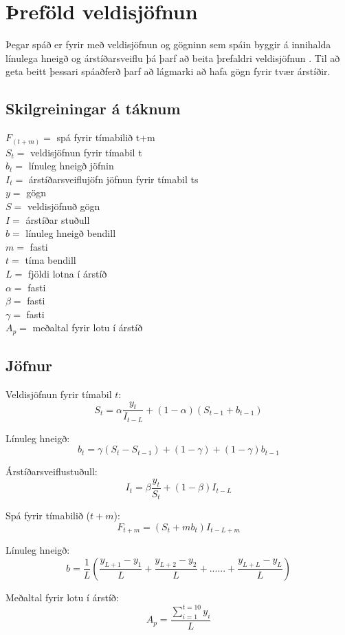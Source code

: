 \section {Þreföld veldisjöfnun}


Þegar spáð er fyrir með veldisjöfnun og gögninn sem spáin byggir á innihalda línulega hneigð og árstíðarsveiflu þá þarf að beita þrefaldri veldisjöfnun \cite{HoltWinters}. Til að geta beitt þessari spáaðferð þarf að lágmarki að hafa gögn fyrir tvær árstíðir.

\subsection{Skilgreiningar á táknum}
	$F_(t+m)=$ spá fyrir tímabilið  t+m \\
	$S_t =$  veldisjöfnun fyrir tímabil t\\
	$b_t =$ línuleg hneigð jöfnin \\
	$I_t =$ árstíðarsveiflujöfn jöfnun fyrir tímabil ts \\
	$y =$ gögn\\
	$S =$ veldisjöfnuð gögn \\
	$I =$	árstíðar stuðull \\
	$b =$ línuleg hneigð bendill \\
	$m =$ fasti	\\
	$t =$ tíma bendill \\
	$L =$ fjöldi lotna í árstíð \\
	$\alpha =$ fasti \\
	$\beta =$ fasti \\
	$\gamma =$ fasti \\
	$A_p =$ meðaltal fyrir lotu í árstíð\\


\subsection{Jöfnur}

\noindent Veldisjöfnun fyrir tímabil $t$:
	$$S_t = \alpha\dfrac{y_t}{I_{t - L}} + (1-\alpha)(S_{t-1}+ b_{t-1} ) $$

\noindent Línuleg hneigð:
	$$b_t = \gamma  (S_{t}-S_{t-1})+(1- \gamma) + (1 - \gamma)b_{t-1}$$

\noindent Árstíðarsveiflustuðull:
	$$I_t = \beta \dfrac{y_t}{S_t} +(1-\beta)I_{t-L} $$

\noindent Spá fyrir tímabilið ($t+m$):
	$$F_{t+m} = (S_{t} +mb_{t})I_{t-L+m}$$

\noindent Línuleg hneigð:
	$$b= \dfrac{1}{L}(\dfrac{y_{L+1}-y_1}{L} + \dfrac{y_{L+2}-y_2}{L}+......+ \dfrac{y_{L+L}-y_L}{L} ) $$

\noindent Meðaltal fyrir lotu í árstíð:
	$$A_p = \dfrac{\sum_{i=1}^{t=10} y_i}{L} $$